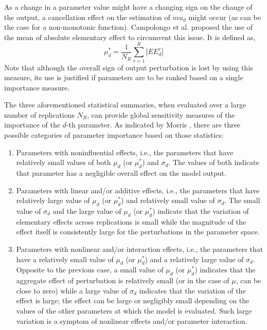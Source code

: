 As a change in a parameter value might have a changing sign on the change of the output,
a cancellation effect on the estimation of $mu_d$ might occur 
(as can be the case for a non-monotonic function).
Campolongo et al. \cite{Campolongo2011} proposed the use of the mean of absolute elementary effect to circumvent this issue.
It is defined as,
\begin{equation}
	\mu^*_d = \frac{1}{N_R} \sum_{r = 1}^{R} |EE^r_d|
	\label{eq:sa_morris_mustar}
\end{equation}
Note that although the overall sign of output perturbation is lost by using this measure,
its use is justified if parameters are to be ranked based on a single importance measure.

The three aforementioned statistical summaries, when evaluated over a large number of replications $N_R$,
can provide global sensitivity measures of the importance of the $d$-th parameter.
As indicated by Morris \cite{Morris1991}, there are three possible categories of parameter importance based on those statistics:
\begin{enumerate}
	\item Parameters with noninfluential effects, i.e., the parameters that have relatively small values of both $\mu_d$ (or $\mu^*_d$) and $\sigma_d$.
	The values of both indicate that parameter has a negligible overall effect on the model output.
	\item Parameters with linear and/or additive effects, i.e., the parameters that have relatively large value of $\mu_d$ (or $\mu^*_d$) and relatively small value of $\sigma_d$.
	The small value of $\sigma_d$ and the large value of $\mu_d$ (or $\mu^*_d$) indicate that the variation of elementary effects across replications is small while the magnitude of the effect itself is consistently large for the perturbations in the parameter space.
	\item Parameters with nonlinear and/or interaction effects, i.e., the parameters that have a relatively small value of $\mu_d$ (or $\mu^*_d$) and a relatively large value of $\sigma_d$.
	Opposite to the previous case, a small value of $\mu_d$ (or $\mu^*_d$) indicates that the aggregate effect of perturbation is relatively small (or in the case of $\mu$, can be close to zero) while a large value of $\sigma_d$ indicates that the variation of the effect is large; the effect can be large or negligibly small depending on the values of the other parameters at which the model is evaluated.
	Such large variation is a symptom of nonlinear effects and/or parameter interaction.
\end{enumerate}

